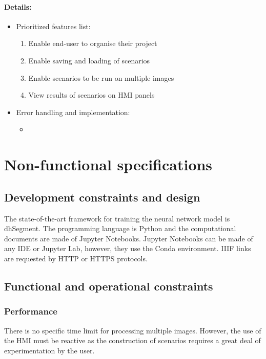\documentclass{polytech/polytech}
\numberwithin{figure}{chapter}
\begin{document}
\begin{appendix}
\paragraph{Details:}

\begin{itemize}
    \item Prioritized features list: 
    \begin{enumerate}
        \item	Enable end-user to organise their project
        \item	Enable saving and loading of scenarios
        \item	Enable scenarios to be run on multiple images
        \item	View results of scenarios on HMI panels
    \end{enumerate}
    \item Error handling and implementation: 
    \begin{itemize}
        \item	
    \end{itemize}
\end{itemize}


\section{Non-functional specifications}

\subsection{Development constraints and design}

The state-of-the-art framework for training the neural network model is dhSegment. The programming language is Python and the computational documents are made of Jupyter Notebooks. Jupyter Notebooks can be made of any IDE or Jupyter Lab, however, they use the Conda environment. IIIF links are requested by HTTP or HTTPS protocols.

\subsection{Functional and operational constraints}

\subsubsection{Performance}

There is no specific time limit for processing multiple images. However, the use of the HMI must be reactive as the construction of scenarios requires a great deal of experimentation by the user.


\end{appendix}
\end{document}
